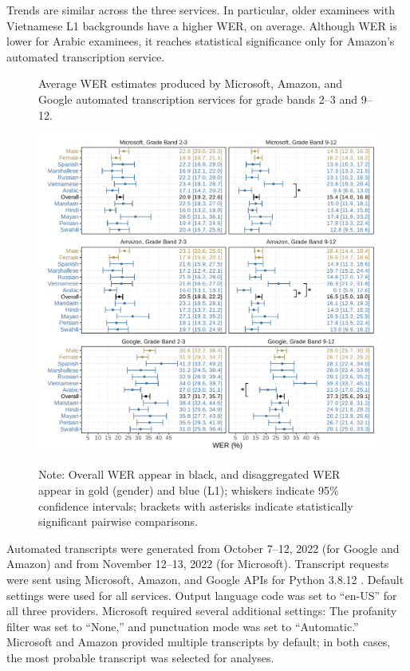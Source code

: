 \documentclass [PhD] {uclathes}
\begin{document}
Trends are similar across the three services. In particular, older examinees with Vietnamese L1 backgrounds have a higher WER, on average. Although WER is lower for Arabic examinees, it reaches statistical significance only for Amazon’s automated transcription service. 

\begin{figure}[h]
    \centering
    \caption{Average WER estimates produced by Microsoft, Amazon, and Google automated transcription services for grade bands 2–3 and 9–12.}
    \includegraphics[width=6.5in]{figures/20230513_adj_werPlot_sigBars.pdf}
    \label{fig:wer_all}
\caption*{\small Note: Overall WER appear in black, and disaggregated WER appear in gold (gender) and blue (L1); whiskers indicate 95\% confidence intervals; brackets with asterisks indicate statistically significant pairwise comparisons.}
\end{figure}

Automated transcripts were generated from October 7–12, 2022 (for Google and Amazon) and from November 12–13, 2022 (for Microsoft). Transcript requests were sent using Microsoft, Amazon, and Google APIs for Python 3.8.12 \citep{python2022}. Default settings were used for all services. Output language code was set to “en-US” for all three providers. Microsoft required several additional settings: The profanity filter was set to “None,” and punctuation mode was set to “Automatic.” Microsoft and Amazon provided multiple transcripts by default; in both cases, the most probable transcript was selected for analyses. 
\end{document}
